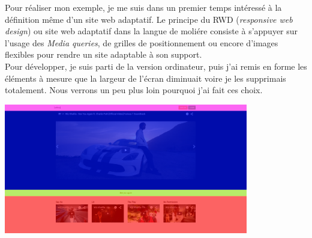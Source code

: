 \documentclass{article}
\begin{document}
Pour r\'ealiser mon exemple, je me suis dans un premier temps int\'eress\'e \`a la d\'efinition m\^eme d'un site web adaptatif. Le principe du RWD (\textit{responsive web design}) ou site web adaptatif dans la langue de moli\'ere consiste \`a s'appuyer sur l'usage des \textit{Media queries}, de grilles de positionnement ou encore d'images flexibles pour rendre un site adaptable \`a son support.\\
Pour d\'evelopper, je suis parti de la version ordinateur, puis j'ai remis en forme les \'el\'ements \`a mesure que la largeur de l'\'ecran diminuait voire je les supprimais totalement. Nous verrons un peu plus loin pourquoi j'ai fait ces choix.
\begin{center}
\vspace{0.5cm}
\includegraphics[width=0.8\textwidth]{pc2}
\vspace{0.5cm}
\end{center}
\end{document}
